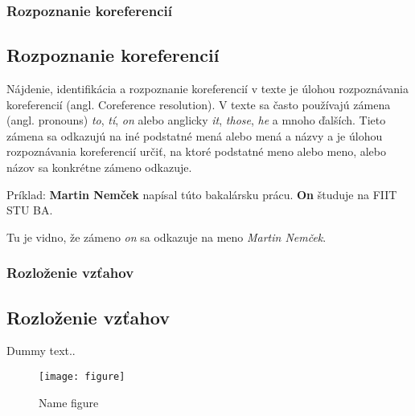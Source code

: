 {
	\subsubsection{Rozpoznanie koreferencií}
}
{
	\subsection{Rozpoznanie koreferencií}
}
\label{subsubsec:corefparsing}
Nájdenie, identifikácia a rozpoznanie koreferencií v texte je úlohou rozpoznávania koreferencií (angl. Coreference resolution). V texte sa často používajú zámena (angl. pronouns) \textit{to}, \textit{tí}, \textit{on} alebo anglicky \textit{it}, \textit{those}, \textit{he} a mnoho ďalších. Tieto zámena sa odkazujú na iné podstatné mená alebo mená a názvy a je úlohou rozpoznávania koreferencií určiť, na ktoré podstatné meno alebo meno, alebo názov sa konkrétne zámeno odkazuje.

Príklad:
\textbf{Martin Nemček} napísal túto bakalársku prácu. \textbf{On} študuje na FIIT STU BA.

Tu je vidno, že zámeno \textit{on} sa odkazuje na meno \textit{Martin Nemček}.

{
	\subsubsection{Rozloženie vzťahov}
}
{
	\subsection{Rozloženie vzťahov}
}
\label{subsubsec:dependencyparsing}
Dummy text..


\begin{figure}[H]
\begin{center}\texttt{[image: figure]}\end{center}
\caption[Name figure]{Name figure}\label{fig:figure}
\end{figure}
